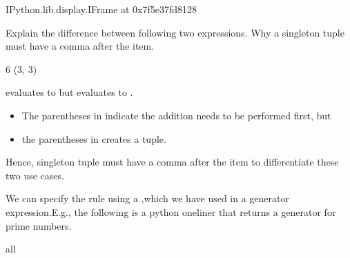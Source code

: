 \documentclass[letterpaper,10pt,english]{sphinxmanual}
\begin{document}
\begin{sphinxVerbatim}[commandchars=\\\{\}]
\PYGZlt{}IPython.lib.display.IFrame at 0x7f5e37fd8128\PYGZgt{}
\end{sphinxVerbatim}

 Explain the difference between following two expressions. Why a singleton tuple must have a comma after the item.

\begin{sphinxVerbatim}[commandchars=\\\{\}]
       
\end{sphinxVerbatim}

\begin{sphinxVerbatim}[commandchars=\\\{\}]
6
(3, 3)
\end{sphinxVerbatim}

 evaluates to  but  evaluates to .
\begin{itemize}
\item {} 
The parentheses in  indicate the addition needs to be performed first, but

\item {} 
the parentheses in  creates a tuple.

\end{itemize}

Hence, singleton tuple must have a comma after the item to differentiate these two use cases.


We can specify the rule using a ,which we have used in a generator expression.E.g., the following is a python one\sphinxhyphen{}liner that returns a generator for prime numbers.

\begin{sphinxVerbatim}[commandchars=\\\{\}]
all
         
                                       
\end{sphinxVerbatim}
\end{document}
